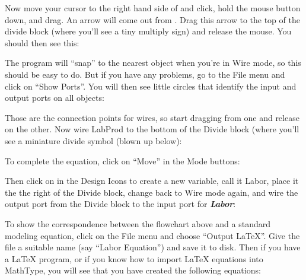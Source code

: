 \begin{center}
\end{center}


Now move your cursor to the right hand side of
  and click, hold the mouse button down, and
drag. An arrow will come out from  . Drag
this arrow to the top of the divide block (where you'll see a tiny
multiply sign) and release the mouse. You should then see this: 

\begin{center}
\end{center}


The program will ``snap'' to the nearest object when you're in Wire
mode, so this should be easy to do. But if you have any problems, go
to the File menu and click on ``Show Ports''. You will then see little
circles that identify the input and output ports on all objects: 

\begin{center}
\end{center}

Those are the connection points for wires, so start dragging from one
and release on the other. Now wire LabProd to the bottom of the Divide
block (where you'll see a miniature divide symbol (blown up below): 

\begin{center}
\end{center}


To complete the equation, click on ``Move'' in the Mode buttons:

\begin{center}
\end{center}


Then click on  in the Design Icons to create a new variable, call it
Labor, place it the the right of the Divide block, change back to Wire
mode again, and wire the output port from the Divide block to the
input port for {\bf\em Labor}: 

\begin{center}
\end{center}


To show the correspondence between the flowchart above and a standard
modeling equation, click on the File menu and choose ``Output
LaTeX''. Give the file a suitable name (say ``Labor Equation'') and
save it to disk. Then if you have a \LaTeX{} program, or if you know how
to import \LaTeX{} equations into MathType, you will see that you have
created the following equations: 

